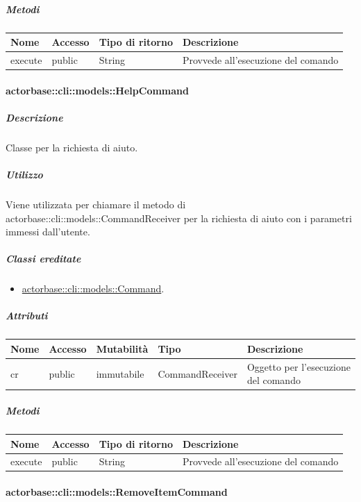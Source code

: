 \documentclass{scalatekids-article}
\begin{document}
\subparagraph{Metodi}

\begin{tabular}{| l | l | l | l |}
  \hline
  Nome & Accesso & Tipo di ritorno & Descrizione\\
  \hline
  execute & public & String & Provvede all'esecuzione del comando\\
  \hline
\end{tabular}

\paragraph{actorbase::cli::models::HelpCommand}
\label{sec:actorbase::cli::models::HelpCommand}

\subparagraph{Descrizione}
Classe per la richiesta di aiuto.

\subparagraph{Utilizzo}

Viene utilizzata per chiamare il metodo di
actorbase::cli::models::CommandReceiver per la richiesta di aiuto con i
parametri immessi dall'utente.

\subparagraph{Classi ereditate}

\begin{itemize}
\item \hyperref[sec:actorbase::cli::models::Command]{actorbase::cli::models::Command}.
\end{itemize}

\subparagraph{Attributi}

\begin{tabular}{| p{1cm} | p{1.5cm} | p{2cm} | p{4cm} | p{8.5cm} |}
  \hline
  Nome & Accesso & Mutabilità & Tipo & Descrizione\\
  \hline
  cr & public & immutabile & CommandReceiver & Oggetto per l'esecuzione del comando\\
  \hline
\end{tabular}

\subparagraph{Metodi}

\begin{tabular}{| l | l | l | l |}
  \hline
  Nome & Accesso & Tipo di ritorno & Descrizione\\
  \hline
  execute & public & String & Provvede all'esecuzione del comando\\
  \hline
\end{tabular}

\paragraph{actorbase::cli::models::RemoveItemCommand}
\label{sec:actorbase::cli::models::RemoveItemCommand}
\end{document}
